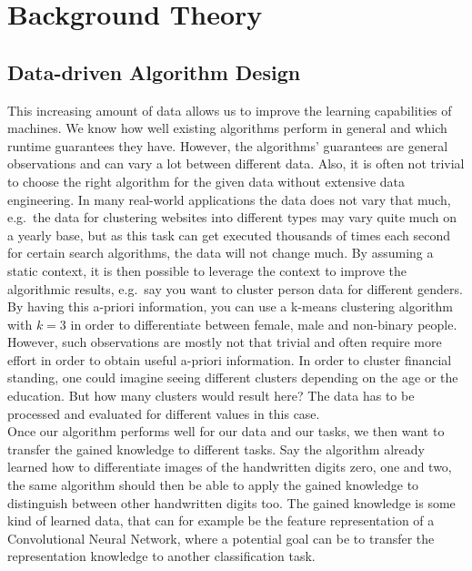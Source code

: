 \chapter{Background Theory}
\label{chapter:background}

\section{Data-driven Algorithm Design}

This increasing amount of data allows us to improve the learning capabilities of machines. We know how well existing algorithms perform in general and which runtime guarantees they have. However, the algorithms' guarantees are general observations and can vary a lot between different data. Also, it is often not trivial to choose the right algorithm for the given data without extensive data engineering. In many real-world applications the data does not vary that much, e.g.\ the data for clustering websites into different types may vary quite much on a yearly base, but as this task can get executed thousands of times each second for certain search algorithms, the data will not change much. By assuming a static context, it is then possible to leverage the context to improve the algorithmic results, e.g.\ say you want to cluster person data for different genders. By having this a-priori information, you can use a k-means clustering algorithm with $k = 3$ in order to differentiate between female, male and non-binary people.\\

However, such observations are mostly not that trivial and often require more effort in order to obtain useful a-priori information. In order to cluster financial standing, one could imagine seeing different clusters depending on the age or the education. But how many clusters would result here? The data has to be processed and evaluated for different values in this case.\\

Once our algorithm performs well for our data and our tasks, we then want to transfer the gained knowledge to different tasks. Say the algorithm already learned how to differentiate images of the handwritten digits zero, one and two, the same algorithm should then be able to apply the gained knowledge to distinguish between other handwritten digits too. The gained knowledge is some kind of learned data, that can for example be the feature representation of a Convolutional Neural Network, where a potential goal can be to transfer the representation knowledge to another classification task.\\

